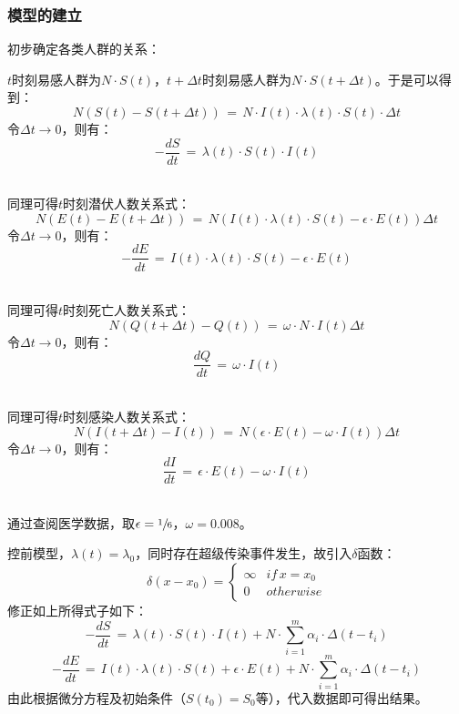 \subsubsection{模型的建立}
初步确定各类人群的关系：\\[1cm]\par
$t$时刻易感人群为$N\cdot{}S(t)$，$t+\Delta{}t$时刻易感人群为$N\cdot{}S(t+\Delta{}t)$。于是可以得到：
$$N\left(S(t)-S(t+\Delta{}t)\right)\,=\,N\cdot{}I(t)\cdot{}\lambda{}(t)\cdot{}S(t)\cdot{}\Delta{}t$$
令$\Delta{}t\rightarrow{}0$，则有：
$$-\frac{dS}{dt}\,=\,\lambda{}(t)\cdot{}S(t)\cdot{}I(t)$$\\[1cm]\par

同理可得$t$时刻潜伏人数关系式：
$$N\left(E(t)-E(t+\Delta{}t)\right)\,=\,N\left(I(t)\cdot{}\lambda{}(t)\cdot{}S(t)-\epsilon{}\cdot{}E(t)\right)\Delta{}t$$
令$\Delta{}t\rightarrow{}0$，则有：
$$-\frac{dE}{dt}\,=\,I(t)\cdot{}\lambda{}(t)\cdot{}S(t)-\epsilon{}\cdot{}E(t)$$\\[1cm]\par

同理可得$t$时刻死亡人数关系式：
$$N\left(Q(t+\Delta{}t)-Q(t)\right)\,=\,\omega{}\cdot{}N\cdot{}I(t)\Delta{}t$$
令$\Delta{}t\rightarrow{}0$，则有：
$$\frac{dQ}{dt}\,=\,\omega{}\cdot{}I(t)$$\\[1cm]\par

同理可得$t$时刻感染人数关系式：
$$N\left(I(t+\Delta{}t)-I(t)\right)\,=\,N\left(\epsilon\cdot E(t)-\omega\cdot I(t)\right)\Delta{}t$$
令$\Delta{}t\rightarrow{}0$，则有：
$$\frac{dI}{dt}\,=\,\epsilon\cdot E(t)-\omega\cdot I(t)$$\\[1cm]\par

通过查阅医学数据，取$\epsilon=\sfrac16$，$\omega=0.008$。\\[1cm]\par

控前模型，$\lambda{}(t)=\lambda_0$，同时存在超级传染事件发生，故引入$\delta$函数：$$\delta(x-x_0)=
\begin{cases}
\infty & if\,x=x_0 \\
0    & otherwise
\end{cases}$$
修正如上所得式子如下：
$$-\frac{dS}{dt}\,=\,\lambda{}(t)\cdot{}S(t)\cdot{}I(t)+N\cdot{}\sum_{i=1}^m\alpha_i\cdot\Delta{}(t-t_i)$$
$$-\frac{dE}{dt}\,=\,I(t)\cdot{}\lambda{}(t)\cdot{}S(t)+\epsilon{}\cdot{}E(t)+N\cdot{}\sum_{i=1}^m\alpha_i\cdot\Delta{}(t-t_i)$$
由此根据微分方程及初始条件（$S(t_0)=S_0$等），代入数据即可得出结果。\\[1cm]\par

